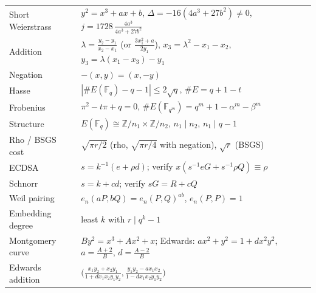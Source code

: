 \documentclass[11pt,a4paper,oneside]{book}
\theoremstyle{plain}
\theoremstyle{definition}
\theoremstyle{remark}
\newcommand{\Z}{\mathbb{Z}}
\newcommand{\F}{\mathbb{F}}
\newcommand{\Fq}{\mathbb{F}_q}
\begin{document}
\begin{center}
\renewcommand{\arraystretch}{1.5}
\begin{tabular}{@{}p{4.4cm}p{10cm}@{}}
\toprule
Short Weierstrass & $y^2=x^3+ax+b$, $\Delta=-16(4a^3+27b^2)\neq0$, $j=1728\,\frac{4a^3}{4a^3+27b^2}$\\
Addition & $\lambda=\frac{y_2-y_1}{x_2-x_1}$ (or $\frac{3x_1^2+a}{2y_1}$), $x_3=\lambda^2-x_1-x_2$, $y_3=\lambda(x_1-x_3)-y_1$\\
Negation & $-(x,y)=(x,-y)$\\
Hasse & $|\#E(\Fq)-q-1|\le2\sqrt q$, $\#E=q+1-t$\\
Frobenius & $\pi^2-t\pi+q=0$, $\#E(\F_{q^m})=q^m+1-\alpha^m-\beta^m$\\
Structure & $E(\Fq)\cong\Z/n_1\times\Z/n_2$, $n_1\mid n_2$, $n_1\mid q-1$\\
Rho / BSGS cost & $\sqrt{\pi r/2}$ (rho, $\sqrt{\pi r/4}$ with negation), $\sqrt r$ (BSGS)\\
ECDSA & $s=k^{-1}(e+\rho d)$; verify $x(s^{-1}eG+s^{-1}\rho Q)\equiv\rho$\\
Schnorr & $s=k+cd$; verify $sG=R+cQ$\\
Weil pairing & $e_n(aP,bQ)=e_n(P,Q)^{ab}$, $e_n(P,P)=1$\\
Embedding degree & least $k$ with $r\mid q^k-1$\\
Montgomery curve & $By^2=x^3+Ax^2+x$; Edwards: $ax^2+y^2=1+dx^2y^2$, $a=\frac{A+2}B$, $d=\frac{A-2}B$\\
Edwards addition & $\big(\frac{x_1y_2+x_2y_1}{1+dx_1x_2y_1y_2},\frac{y_1y_2-ax_1x_2}{1-dx_1x_2y_1y_2}\big)$\\
\bottomrule
\end{tabular}
\end{center}
\end{document}
